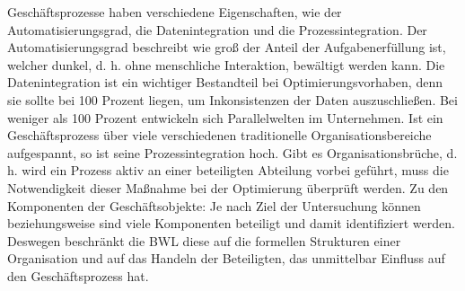 Geschäftsprozesse haben verschiedene Eigenschaften, wie der Automatisierungsgrad, die Datenintegration und die Prozessintegration. Der Automatisierungsgrad beschreibt wie groß der Anteil der Aufgabenerfüllung ist, welcher dunkel, d. h. ohne menschliche Interaktion, bewältigt werden kann. Die Datenintegration ist ein wichtiger Bestandteil bei Optimierungsvorhaben, denn sie sollte bei 100 Prozent liegen, um Inkonsistenzen der Daten auszuschließen. Bei weniger als 100 Prozent entwickeln sich Parallelwelten im Unternehmen. Ist ein Geschäftsprozess über viele verschiedenen traditionelle Organisationsbereiche aufgespannt, so ist seine Prozessintegration hoch. Gibt es Organisationsbrüche, d. h. wird ein Prozess aktiv an einer beteiligten Abteilung vorbei geführt, muss die Notwendigkeit dieser Maßnahme bei der Optimierung überprüft werden. Zu den Komponenten der Geschäftsobjekte: Je nach Ziel der Untersuchung können beziehungsweise sind viele Komponenten beteiligt und damit identifiziert werden. Deswegen beschränkt die \ac{BWL} diese auf die formellen Strukturen einer Organisation und auf das Handeln der Beteiligten, das unmittelbar Einfluss auf den Geschäftsprozess hat.\autocite[vgl.][S.15]{staud_geschaftsprozessanalyse_2006} \par

